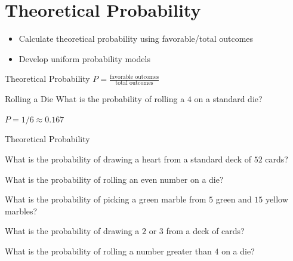 \section{Theoretical Probability}

\begin{learningGoals}
\begin{itemize}
    \item Calculate theoretical probability using favorable/total outcomes
    \item Develop uniform probability models
\end{itemize}
\end{learningGoals}

\begin{conceptBox}{Theoretical Probability}
$P = \frac{\text{favorable outcomes}}{\text{total outcomes}}$
\end{conceptBox}

\begin{workedExample}{Rolling a Die}
What is the probability of rolling a $4$ on a standard die?

$P = 1/6 \approx 0.167$
\end{workedExample}


\begin{practiceBox}{Theoretical Probability}
\resetProblems

\prob What is the probability of drawing a heart from a standard deck of $52$ cards?

\prob What is the probability of rolling an even number on a die?

\prob What is the probability of picking a green marble from $5$ green and $15$ yellow marbles?

\prob What is the probability of drawing a $2$ or $3$ from a deck of cards?

\prob What is the probability of rolling a number greater than $4$ on a die?

\end{practiceBox}
